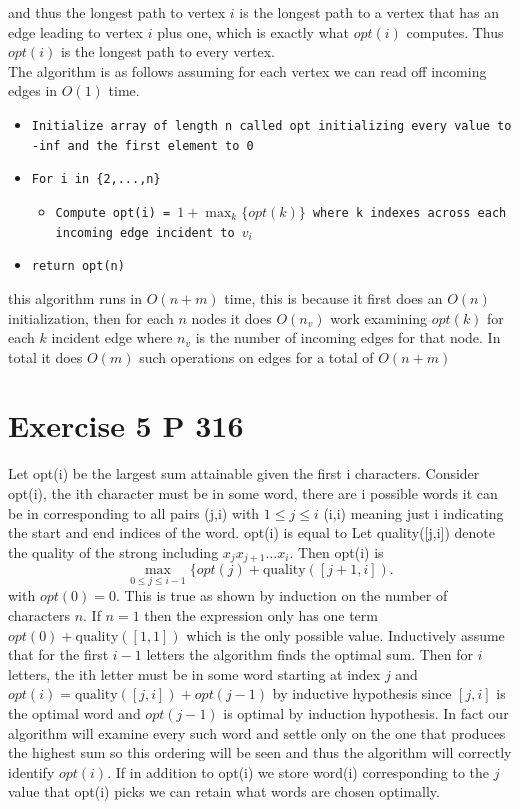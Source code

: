 \documentclass{amsart}
\begin{document}
and thus the longest path to vertex $i$ is the longest path to a vertex that has an edge leading to vertex  $i$ plus one, which is exactly what $opt(i)$ computes. Thus $opt(i)$ is
the longest path to every vertex.
\\
The algorithm is as follows assuming for each vertex we can read off incoming edges in $O(1)$ time.
{\small
    \begin{itemize}
        \item \texttt{Initialize array of length n called opt initializing every value to -inf and the first element to 0}
        \item \texttt{For i in \{2,...,n\}}
            \begin{itemize}
                \item \texttt{Compute opt(i) = $1 + \max_k\{opt(k)\}$ where k indexes across each incoming edge incident to $v_i$}
            \end{itemize}
        \item \texttt{return opt(n)}
    \end{itemize}
}
this algorithm runs in $O(n+m)$ time, this is because it first does an $O(n)$ initialization, then for each $n$ nodes it does $O(n_v)$ work
examining $opt(k)$ for each $k$  incident edge where $n_v$ is the number of incoming edges for that node. In total it does $O(m)$ such operations on edges for a total of $O(n+m)$


\section{Exercise 5 P 316}
Let opt(i) be the largest sum attainable given the first i characters.
Consider opt(i), the ith character must be in some word, there are i possible words it can be in corresponding to all
pairs (j,i) with $1 \le j \le i$ (i,i) meaning just i indicating the start and end indices of the word. opt(i) is equal to
Let quality([j,i]) denote the quality of the strong including  $x_jx_{j+1}...x_i$. Then opt(i) is 
 \[
     \max_{0 \le j \le i-1}\{opt(j)+\text{quality}([j+1,i])
.\] 
with $opt(0) = 0$.
This is true as shown by induction on the number of characters  $n$. If $n=1$ then the expression only has one term $opt(0) + \text{quality}([1,1])$ 
which is the only possible value. Inductively assume that for the first $i-1$ letters the algorithm finds the optimal sum. Then for $i$ letters,
the  ith letter must be in some word starting at index $j$ and $opt(i) = \text{quality}([j,i]) + opt(j-1)$ by inductive hypothesis since  $[j,i]$ is the optimal word
and $opt(j-1)$ is optimal by induction hypothesis. In fact our algorithm will examine every such word and settle only on the one that produces the highest sum so this ordering will be seen
and thus the algorithm will correctly identify $opt(i)$. If in addition to opt(i) we store word(i) corresponding to the $j$ value that opt(i) picks we can retain what words
are chosen optimally.
\end{document}
